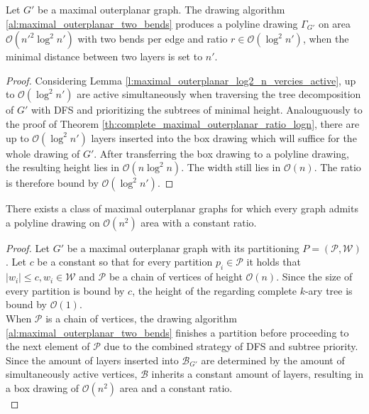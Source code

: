 \begin{theorem}
	Let $G'$ be a maximal outerplanar graph. The drawing algorithm \ref{al:maximal_outerplanar_two_bends} produces a polyline drawing $\Gamma_{G'}$ on area $\mathcal{O}(n'^2 \log^2 n')$ with two bends per edge and ratio $r \in \mathcal{O}(\log^2 n')$, when the minimal distance between two layers is set to $n'$.
\end{theorem}
\begin{proof}
	Considering Lemma \ref{l:maximal_outerplanar_log2_n_vercies_active}, up to $\mathcal{O}(\log^2 n')$ are active simultaneously when traversing the tree decomposition of $G'$ with DFS and prioritizing the subtrees of minimal height. Analouguously to the proof of Theorem \ref{th:complete_maximal_outerplanar_ratio_logn}, there are up to $\mathcal{O}(\log^2 n')$ layers inserted into the box drawing which will suffice for the whole drawing of $G'$. After transferring the box drawing to a polyline drawing, the resulting height lies in $\mathcal{O}(n\log^2 n)$. The width still lies in $\mathcal{O}(n)$. The ratio is therefore bound by $\mathcal{O}
	(\log^2 n')$. 
\end{proof}

\begin{theorem}
	There exists a class of maximal outerplanar graphs for which every graph admits a polyline drawing on $\mathcal{O}(n^2)$ area with a constant ratio.
\end{theorem}
\begin{proof}
	Let $G'$ be a maximal outerplanar graph with its partitioning $P = (\mathcal{P},\mathcal{W})$. Let $c$ be a constant so that for every partition $p_i \in \mathcal{P}$ it holds that $|w_i|\leq c, w_i \in \mathcal{W}$ and $\mathcal{P}$ be a chain of vertices of height $\mathcal{O}(n)$. Since the size of every partition is bound by $c$, the height of the regarding complete $k$-ary tree is bound by $\mathcal{O}(1)$.\\
	When $\mathcal{P}$ is a chain of vertices, the drawing algorithm \ref{al:maximal_outerplanar_two_bends} finishes a partition before proceeding to the next element of $\mathcal{P}$ due to the combined strategy of DFS and subtree priority. Since the amount of layers inserted into $\mathcal{B}_{G'}$ are determined by the amount of simultaneously active vertices, $\mathcal{B}$ inherits a constant amount of layers, resulting in a box drawing of $\mathcal{O}(n^2)$ area and a constant ratio.\\
\end{proof}

